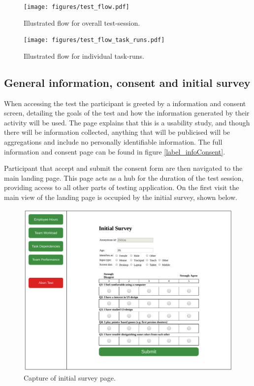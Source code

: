 \documentclass[nofilelist,dvipsnames]{cslthse-msc}
\begin{document}
{      \begin{figure}[h!]
        \centering
        \texttt{[image: figures/test\_flow.pdf]}
        \caption{Illustrated flow for overall test-session.}
      \end{figure}

      \begin{figure}[h!]
        \centering
        \texttt{[image: figures/test\_flow\_task\_runs.pdf]}
        \caption{Illustrated flow for individual task-runs.}
      \end{figure}

      \subsection{General information, consent and initial survey}

        When accessing the test the participant is greeted by a information and
        consent screen, detailing the goals of the test and how the information
        generated by their activity will be used. The page explains that this
        is a usability study, and though there will be information collected,
        anything that will be publicised will be aggregations and include no
        personally identifiable information. The full information and consent
        page can be found in figure \ref{label_infoConsent}.

        Participant that accept and submit the consent form are then navigated
        to the main landing page. This page acts as a hub for the duration of
        the test session, providing access to all other parts of testing
        application. On the first visit the main view of the landing page is
        occupied by the initial survey, shown below.

        \begin{figure}[h!]
          \centering
          \includegraphics[width=.7\textwidth]{figures/captures/webapp_pre_survey.pdf}
          \caption{Capture of initial survey page.}
          \label{label_preSurvey}
        \end{figure}

}
\end{document}
